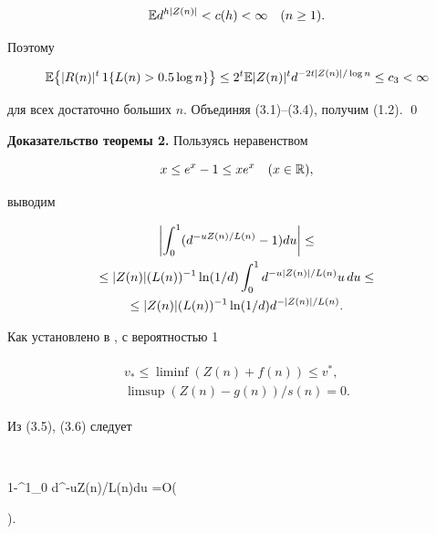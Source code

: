 $$ 


\Bbb E d^{h|Z(n)|}<c(h)<\infty \quad (n\ge 1). 


$$ 


Поэтому 


\begin{equation} 


{\Bbb E}\bigl\{|R(n)|^t\,1\{L(n)>0{.}5\log n\}\bigr\}


\le 2^t\Bbb E|Z(n)|^t d^{-2t|Z(n)|/\log n}\le c_3<\infty 


\end{equation} 


для всех достаточно больших $n$. Объединяя (3.1)--(3.4), получим (1.2). \qed 


 


{\bf Доказательство теоремы 2.} Пользуясь неравенством 


$$ 


x\le e^x-1\le xe^x \quad (x\in\Bbb R), 


$$ 


выводим 


\begin{gather} 


\biggl|\int^1_0(d^{-uZ(n)/L(n)}-1)du\biggr|\le\notag\\ 


\le |Z(n)|(L(n))^{-1}\ln(1/d)\int^1_0 d^{-u|Z(n)|/L(n)}u\,du\le\notag\\ 


\le |Z(n)|(L(n))^{-1}\ln(1/d)d^{-|Z(n)|/L(n)}. 


\end{gather} 


Как установлено в \cite{Nov2}, с вероятностью 1 


\begin{gather} 


\begin{split} 


v_*\le \liminf (Z(n)+f(n))\le v^*,\\ 


\limsup (Z(n)-g(n))/s(n)=0. 


\end{split} 


\end{gather} 


Из (3.5), (3.6) следует 


$$ 


1-\int^1_0 d^{-uZ(n)/L(n)}du =O\biggl( 


\biggr)\quad{}\;. 


